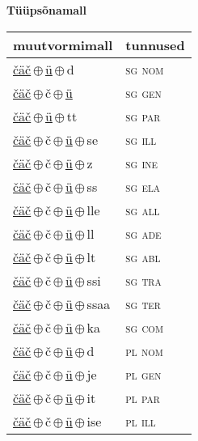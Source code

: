 

\vspace{3.5em}
\noindent \begin{minipage}{\textwidth}
\noindent \textbf{Tüüpsõnamall \,}\\

\begin{sideways}
\begin{tabular}{l l}
muutvormimall & tunnused \\
\hline
\underline{čäč}\,$\oplus$\,\underline{ü}\,$\oplus$\,d & \textsc{ sg nom } \\
\underline{čäč}\,$\oplus$\,č\,$\oplus$\,\underline{ü} & \textsc{ sg gen } \\
\underline{čäč}\,$\oplus$\,\underline{ü}\,$\oplus$\,tt & \textsc{ sg par } \\
\underline{čäč}\,$\oplus$\,č\,$\oplus$\,\underline{ü}\,$\oplus$\,se & \textsc{ sg ill } \\
\underline{čäč}\,$\oplus$\,č\,$\oplus$\,\underline{ü}\,$\oplus$\,z & \textsc{ sg ine } \\
\underline{čäč}\,$\oplus$\,č\,$\oplus$\,\underline{ü}\,$\oplus$\,ss & \textsc{ sg ela } \\
\underline{čäč}\,$\oplus$\,č\,$\oplus$\,\underline{ü}\,$\oplus$\,lle & \textsc{ sg all } \\
\underline{čäč}\,$\oplus$\,č\,$\oplus$\,\underline{ü}\,$\oplus$\,ll & \textsc{ sg ade } \\
\underline{čäč}\,$\oplus$\,č\,$\oplus$\,\underline{ü}\,$\oplus$\,lt & \textsc{ sg abl } \\
\underline{čäč}\,$\oplus$\,č\,$\oplus$\,\underline{ü}\,$\oplus$\,ssi & \textsc{ sg tra } \\
\underline{čäč}\,$\oplus$\,č\,$\oplus$\,\underline{ü}\,$\oplus$\,ssaa & \textsc{ sg ter } \\
\underline{čäč}\,$\oplus$\,č\,$\oplus$\,\underline{ü}\,$\oplus$\,ka & \textsc{ sg com } \\
\underline{čäč}\,$\oplus$\,č\,$\oplus$\,\underline{ü}\,$\oplus$\,d & \textsc{ pl nom } \\
\underline{čäč}\,$\oplus$\,č\,$\oplus$\,\underline{ü}\,$\oplus$\,je & \textsc{ pl gen } \\
\underline{čäč}\,$\oplus$\,č\,$\oplus$\,\underline{ü}\,$\oplus$\,it & \textsc{ pl par } \\
\underline{čäč}\,$\oplus$\,č\,$\oplus$\,\underline{ü}\,$\oplus$\,ise & \textsc{ pl ill } \\

\end{tabular}
\end{sideways}
\end{minipage}
